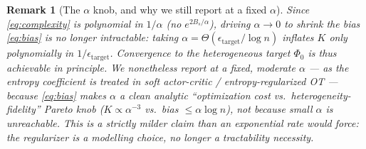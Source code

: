 \documentclass[11pt]{article}
\newtheorem{remark}{Remark}
\begin{document}
\begin{remark}[The $\alpha$ knob, and why we still report at a fixed $\alpha$]
\label{rem:fixed-alpha}
Since \eqref{eq:complexity} is \emph{polynomial} in $1/\alpha$ (no $e^{2B_s/\alpha}$), driving $\alpha\to0$ to shrink the bias \eqref{eq:bias} is no longer intractable: taking $\alpha=\Theta(\epsilon_{\mathrm{target}}/\log n)$ inflates $K$ only \emph{polynomially} in $1/\epsilon_{\mathrm{target}}$. Convergence to the heterogeneous target $\Phi_0$ is thus achievable in principle. We nonetheless \emph{report} at a fixed, moderate $\alpha$ --- as the entropy coefficient is treated in soft actor-critic / entropy-regularized OT --- because \eqref{eq:bias} makes $\alpha$ a clean \emph{analytic} ``optimization cost vs.\ heterogeneity-fidelity'' Pareto knob ($K\propto\alpha^{-3}$ vs.\ bias $\le\alpha\log n$), not because small $\alpha$ is unreachable. This is a \emph{strictly milder} claim than an exponential rate would force: the regularizer is a modelling choice, no longer a tractability necessity.
\end{remark}
\end{document}
